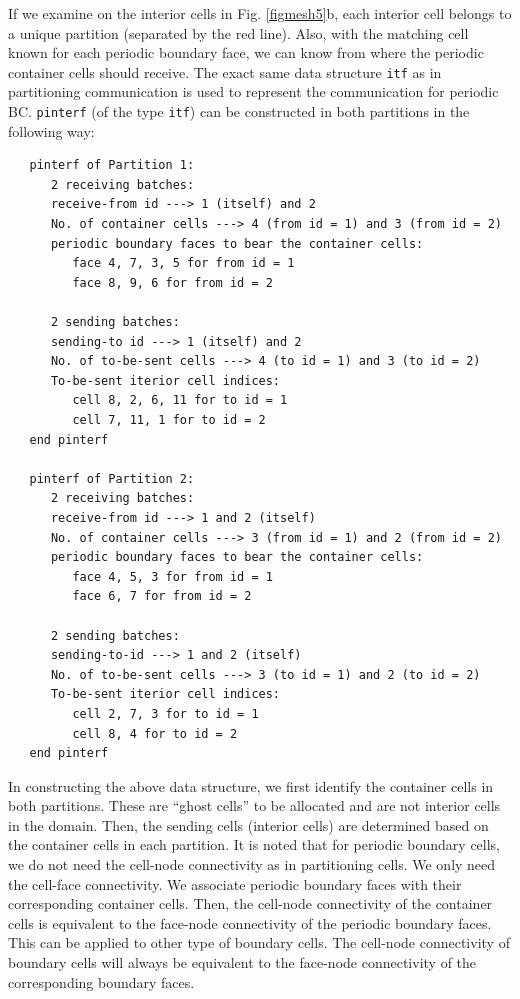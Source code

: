 \documentclass[12pt, letterpaper]{report}
\begin{document}
If we examine on the interior cells in Fig. \ref{figmesh5}b, each interior cell belongs to a
unique partition (separated by the red line). Also, with the matching cell known for each
periodic boundary face, we can know from where the periodic container cells should receive.
The exact same data structure \verb+itf+ as in partitioning communication is used to represent
the communication for periodic BC. \verb+pinterf+ (of the type \verb+itf+) can be constructed in both
partitions in the following way:

\begin{verbatim}
   pinterf of Partition 1:
      2 receiving batches:
      receive-from id ---> 1 (itself) and 2
      No. of container cells ---> 4 (from id = 1) and 3 (from id = 2)
      periodic boundary faces to bear the container cells:
         face 4, 7, 3, 5 for from id = 1
         face 8, 9, 6 for from id = 2

      2 sending batches:
      sending-to id ---> 1 (itself) and 2
      No. of to-be-sent cells ---> 4 (to id = 1) and 3 (to id = 2)
      To-be-sent iterior cell indices:
         cell 8, 2, 6, 11 for to id = 1
         cell 7, 11, 1 for to id = 2
   end pinterf

   pinterf of Partition 2:
      2 receiving batches:
      receive-from id ---> 1 and 2 (itself)
      No. of container cells ---> 3 (from id = 1) and 2 (from id = 2)
      periodic boundary faces to bear the container cells:
         face 4, 5, 3 for from id = 1
         face 6, 7 for from id = 2

      2 sending batches:
      sending-to-id ---> 1 and 2 (itself)
      No. of to-be-sent cells ---> 3 (to id = 1) and 2 (to id = 2)
      To-be-sent iterior cell indices:
         cell 2, 7, 3 for to id = 1
         cell 8, 4 for to id = 2
   end pinterf
\end{verbatim}

In constructing the above data structure, we first identify the container cells in both partitions.
These are ``ghost cells'' to be allocated and are not interior cells in the domain. Then, the
sending cells (interior cells) are determined based on the container cells in each partition. It is
noted that for periodic boundary cells, we do not need the cell-node connectivity as in partitioning
cells. We only need the cell-face connectivity. We associate periodic boundary faces with their
corresponding container cells. Then, the cell-node connectivity of the container cells is equivalent
to the face-node connectivity of the periodic boundary faces. This can be applied to other type of
boundary cells. The cell-node connectivity of boundary cells will always be equivalent to the
face-node connectivity of the corresponding boundary faces.
\paraspace
\end{document}
